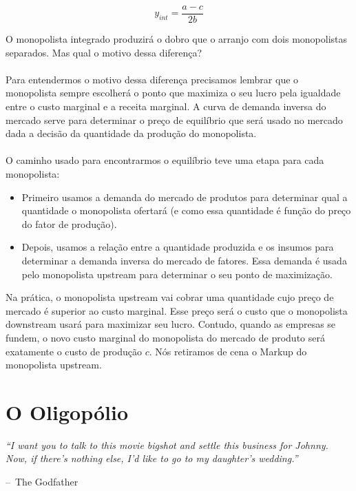 \documentclass[a4paper,11pt,oneside]{book}
\makeatletter
\theoremstyle{definition}
\theoremstyle{break}
\newenvironment{chapquote}[2][2em]
  {\setlength{\@tempdima}{#1}%
   \def\chapquote@author{#2}%
   \parshape 1 \@tempdima \dimexpr\textwidth-2\@tempdima\relax%
   \itshape}
  {\par\normalfont\hfill--\ \chapquote@author\hspace*{\@tempdima}\par\bigskip}
\makeatother
\begin{document}
$$ y_{int} = \frac{a - c}{2b}$$

O monopolista integrado produzirá o dobro que o arranjo com dois monopolistas separados. Mas qual o motivo dessa diferença?
\\~\\
Para entendermos o motivo dessa diferença precisamos lembrar que o monopolista sempre escolherá o ponto que maximiza o seu lucro pela igualdade entre o custo marginal e a receita marginal. A curva de demanda inversa do mercado serve para determinar o preço de equilíbrio que será usado no mercado dada a decisão da quantidade da produção do monopolista.
\\~\\
O caminho usado para encontrarmos o equilíbrio teve uma etapa para cada monopolista:
\begin{itemize}

\item Primeiro usamos a demanda do mercado de produtos para determinar qual a quantidade o monopolista ofertará (e como essa quantidade é função do preço do fator de produção).

\item Depois, usamos a relação entre a quantidade produzida e os insumos para determinar a demanda inversa do mercado de fatores. Essa demanda é usada pelo monopolista upstream para determinar o seu ponto de maximização.

\end{itemize}

Na prática, o monopolista upstream vai cobrar uma quantidade cujo preço de mercado é superior ao custo marginal. Esse preço será o custo que o monopolista downstream usará para maximizar seu lucro. Contudo, quando as empresas se fundem, o novo custo marginal do monopolista do mercado de produto será exatamente o custo de produção $c$. Nós retiramos de cena o Markup do monopolista upstream.

\chapter{O Oligopólio}

\begin{chapquote}{The Godfather}
	``I want you to talk to this movie bigshot and settle this business for Johnny. Now, if there's nothing else, I'd like to go to my daughter's wedding.''
\end{chapquote}
\end{document}
